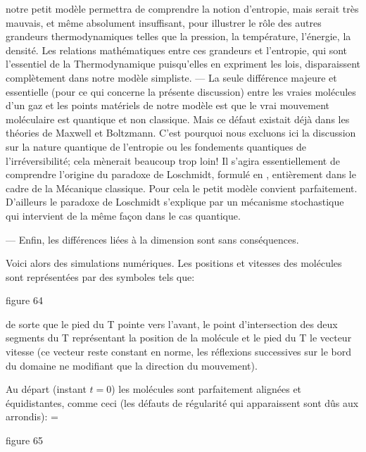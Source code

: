 notre petit mod\`ele permettra de comprendre la notion d'entropie, mais 
serait tr\`es mauvais, et m\^eme absolument insuffisant, pour illustrer 
le r\^ole des autres grandeurs thermodynamiques telles que la pression, 
la temp\'erature, l'\'energie, la densit\'e. Les relations math\'ematiques 
entre ces grandeurs et l'entropie, qui sont l'essentiel de la 
Thermodynamique puisqu'elles en expriment les lois, disparaissent
compl\`etement dans notre mod\`ele simpliste.
\medskip
--- La seule diff\'erence majeure et essentielle (pour ce qui concerne 
la pr\'esente discussion) entre les vraies mol\'ecules d'un gaz et 
les points mat\'eriels de notre mod\`ele est que le vrai mouvement 
mol\'eculaire est quantique et non classique. Mais ce d\'efaut existait
d\'ej\`a dans les th\'eories de Maxwell et Boltzmann. 
C'est pourquoi nous excluons ici la discussion sur la nature quantique de l'entropie ou 
les fondements quantiques de l'irr\'eversibilit\'e; cela m\`enerait 
beaucoup trop loin! Il s'agira essentiellement de comprendre l'origine 
du paradoxe de Loschmidt, formul\'e en {}, enti\`erement dans 
le cadre de la M\'ecanique classique. Pour cela le petit mod\`ele convient 
parfaitement. D'ailleurs le paradoxe de Loschmidt s'explique par un 
m\'ecanisme stochastique qui intervient de la m\^eme fa\c{c}on dans 
le cas quantique.
\medskip

--- Enfin, les diff\'erences li\'ees \`a la dimension sont sans 
cons\'equences.

\bigskip


Voici alors des simulations num\'eriques. Les positions et vitesses des
mol\'ecules sont repr\'esent\'ees par des symboles tels que:
\medskip


\centerline{}\centerline{\eightrm figure 64}
\medskip


\noindent de sorte que le pied du T pointe vers l'avant, le point
d'intersection des deux segments du T repr\'esentant la position de la
mol\'ecule et le pied du T le vecteur vitesse (ce vecteur reste constant
en norme, les r\'eflexions successives sur le bord du domaine ne modifiant
que la direction du mouvement).
\medskip

Au d\'epart (instant $t=0$) les mol\'ecules sont parfaitement align\'ees
et \'equidistantes, comme ceci (les d\'efauts de r\'egularit\'e qui
apparaissent
sont d\^us aux arrondis):
\medskip
\epsfxsize=\hsize
\centerline{}\centerline{\eightrm figure 65}
\medskip

